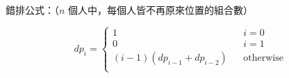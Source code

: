 錯排公式：（$n$ 個人中，每個人皆不再原來位置的組合數）

$$dp_i = \left \{ \begin{align}
    1 && i=0 \\
    0 && i=1 \\
    (i-1) (dp_{i-1}+dp_{i-2}) && \text{otherwise}\\
\end{align}$$
